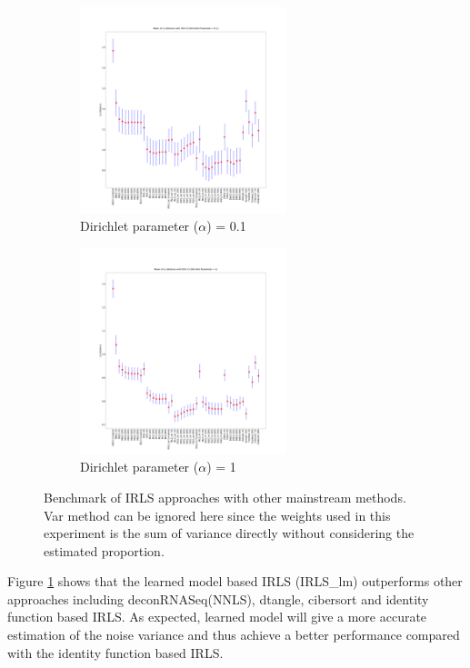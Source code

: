 \documentclass[10pt, a4paper, oneside]{article}
\begin{document}
\begin{figure}
    \begin{subfigure}{6cm}
        \centering\includegraphics[width=6cm]{Figure2/0.1_L1}
        \caption{Dirichlet parameter ($\alpha$) = 0.1}
    \end{subfigure}
    \begin{subfigure}{6cm}
        \centering\includegraphics[width=6cm]{Figure2/1_L1}
        \caption{Dirichlet parameter ($\alpha$) = 1}
    \end{subfigure}
    \caption{Benchmark of IRLS approaches with other mainstream methods. Var method can be ignored here since 
     the weights used in this experiment is the sum of variance directly without considering the estimated proportion.}
    \label{fig2}
\end{figure}

Figure \ref{fig2} shows that the learned model based IRLS (IRLS\_lm) outperforms other approaches including deconRNASeq(NNLS), dtangle, cibersort and identity function based IRLS.
As expected, learned model will give a more accurate estimation of the noise variance and thus achieve a better performance compared with
the identity function based IRLS. 
\end{document}
